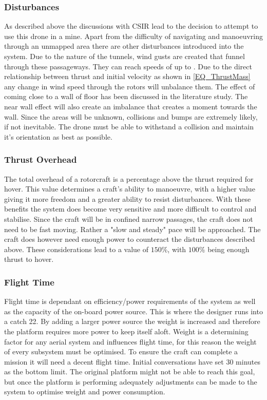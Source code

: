 			\subsubsection{Disturbances}
			As described above the discussions with CSIR lead to the decision to attempt to use this drone in a mine. Apart from the difficulty of navigating and manoeuvring through an unmapped area there are other disturbances introduced into the system. 
			Due to the nature of the tunnels, wind gusts are created that funnel through these passageways. They can reach speeds of up to . Due to the direct relationship between thrust and initial velocity as shown in \eqref{EQ_ThrustMass} any change in wind speed through the rotors will unbalance them.
			The effect of coming close to a wall of floor has been discussed in the literature study. The near wall effect will also create an imbalance that creates a moment towards the wall. 
			Since the areas will be unknown, collisions and bumps are extremely likely, if not inevitable. The drone must be able to withstand a collision and maintain it's orientation as best as possible.
			
			\subsubsection{Thrust Overhead}
			The total overhead of a rotorcraft is a percentage above the thrust required for hover. This value determines a craft's ability to manoeuvre, with a higher value giving it more freedom and a greater ability to resist disturbances. With these benefits the system does become very sensitive and more difficult to control and stabilise. Since the craft will be in confined narrow passages, the craft does not need to be fast moving. Rather a "slow and steady" pace will be approached. The craft does however need enough power to counteract the disturbances described above. These considerations lead to a value of $150\%$, with $100\%$ being enough thrust to hover. 
			
			\subsubsection{Flight Time}
			Flight time is dependant on efficiency/power requirements of the system as well as the capacity of the on-board power source. This is where the designer runs into a catch 22. By adding a larger power source the weight is increased and therefore the platform requires more power to keep itself aloft. Weight is a determining factor for any aerial system and influences flight time, for this reason the weight of every subsystem must be optimised. To ensure the craft can complete a mission it will need a decent flight time. Initial conversations have set 30 minutes as the bottom limit. The original platform might not be able to reach this goal, but once the platform is performing adequately adjustments can be made to the system to optimise weight and power consumption. 
